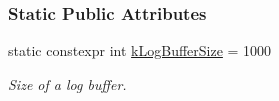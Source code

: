 \subsubsection*{Static Public Attributes}
\begin{DoxyCompactItemize}
\item 
\mbox{\label{classosse_1_1collaborate_1_1_simulation_clock_a026eab97f275ec2d672f40b0b0bb7a3d}} 
static constexpr int \hyperlink{classosse_1_1collaborate_1_1_simulation_clock_a026eab97f275ec2d672f40b0b0bb7a3d}{k\+Log\+Buffer\+Size} = 1000
\begin{DoxyCompactList}\small\item\em Size of a log buffer. \end{DoxyCompactList}\end{DoxyCompactItemize}
